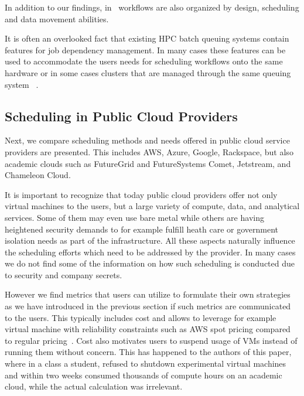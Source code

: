 \documentclass[final,5p,times,twocolumn]{elsarticle}
\begin{document}
In addition to our findings, in~\cite{yu2005taxonomy} workflows are
also organized by design, scheduling and data movement abilities.

It is often an overlooked fact that existing HPC batch queuing systems
contain features for job dependency management. In many cases these
features can be used to accommodate the users needs for scheduling
workflows onto the same hardware or in some cases clusters that are
managed through the same queuing
system
~\cite{www-lsf-job-dep,www-moab-job-dep,www-univa-GE-manual,www-pbs-manual}.







\subsection{Scheduling in Public Cloud Providers}
\label{sec:public}



Next, we compare scheduling methods and needs offered in public cloud
service providers are presented. This includes AWS, Azure, Google,
Rackspace, but also academic clouds such as FutureGrid and
FutureSystems Comet, Jetstream, and Chameleon Cloud.

It is important to recognize that today public cloud providers offer
not only virtual machines to the users, but a large variety of
compute, data, and analytical services. Some of them may even use bare
metal while others are having heightened security demands to for
example fulfill heath care or government isolation needs as part of
the infrastructure. All these aspects naturally influence the
scheduling efforts which need to be addressed by the provider. In many
cases we do not find some of the information on how such scheduling is
conducted due to security and company secrets.

However we find metrics that users can utilize to formulate their own
strategies as we have introduced in the previous section if such
metrics are communicated to the users. This typically includes cost
and allows to leverage for example virtual machine with reliability
constraints such as AWS spot pricing compared to regular
pricing~\cite{AmazonEC22015}.  Cost also motivates users to suspend
usage of VMs instead of running them without concern. This has
happened to the authors of this paper, where in a class a student,
refused to shutdown experimental virtual machines and within two weeks
consumed thousands of compute hours on an academic cloud, while the
actual calculation was irrelevant.
\end{document}
